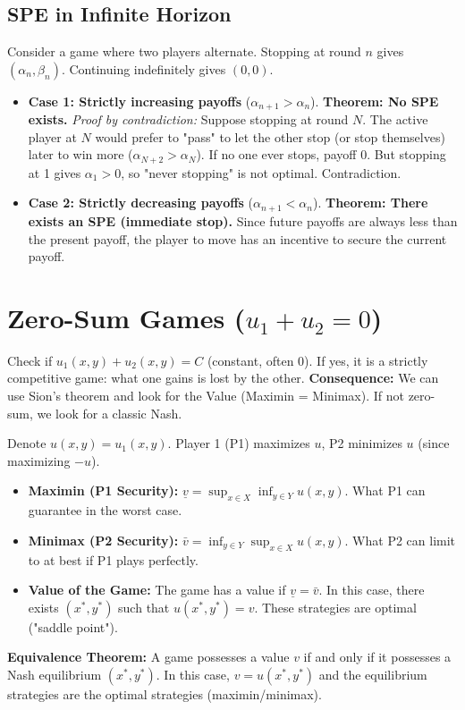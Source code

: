 \documentclass[10pt,a4paper]{article}
\begin{document}
\subsection{SPE in Infinite Horizon}
Consider a game where two players alternate. Stopping at round $n$ gives $(\alpha_n, \beta_n)$. Continuing indefinitely gives $(0,0)$.
\begin{itemize}
    \item \textbf{Case 1: Strictly increasing payoffs} ($\alpha_{n+1} > \alpha_n$).
    \textbf{Theorem: No SPE exists.}
    \textit{Proof by contradiction:}
    Suppose stopping at round $N$. The active player at $N$ would prefer to "pass" to let the other stop (or stop themselves) later to win more ($\alpha_{N+2} > \alpha_N$).
    If no one ever stops, payoff 0. But stopping at 1 gives $\alpha_1 > 0$, so "never stopping" is not optimal. Contradiction.

    \item \textbf{Case 2: Strictly decreasing payoffs} ($\alpha_{n+1} < \alpha_n$).
    \textbf{Theorem: There exists an SPE (immediate stop).}
    Since future payoffs are always less than the present payoff, the player to move has an incentive to secure the current payoff.
\end{itemize}

\section{Zero-Sum Games ($u_1 + u_2 = 0$)}
\begin{tcolorbox}[colback=green!5,title=Tip: Spotting a Zero-Sum Game]
Check if $u_1(x,y) + u_2(x,y) = C$ (constant, often 0).
If yes, it is a strictly competitive game: what one gains is lost by the other.
\textbf{Consequence:} We can use Sion's theorem and look for the Value (Maximin = Minimax). If not zero-sum, we look for a classic Nash.
\end{tcolorbox}
Denote $u(x,y) = u_1(x,y)$. Player 1 (P1) maximizes $u$, P2 minimizes $u$ (since maximizing $-u$).
\begin{itemize}
    \item \textbf{Maximin (P1 Security):} $\underline{v} = \sup_{x \in X} \inf_{y \in Y} u(x,y)$.
    What P1 can guarantee in the worst case.
    \item \textbf{Minimax (P2 Security):} $\bar{v} = \inf_{y \in Y} \sup_{x \in X} u(x,y)$.
    What P2 can limit to at best if P1 plays perfectly.
    \item \textbf{Value of the Game:} The game has a value if $\underline{v} = \bar{v}$. In this case, there exists $(x^*, y^*)$ such that $u(x^*, y^*) = v$. These strategies are optimal ("saddle point").
\end{itemize}
\textbf{Equivalence Theorem:} A game possesses a value $v$ if and only if it possesses a Nash equilibrium $(x^*, y^*)$. In this case, $v = u(x^*, y^*)$ and the equilibrium strategies are the optimal strategies (maximin/minimax).
\end{document}
